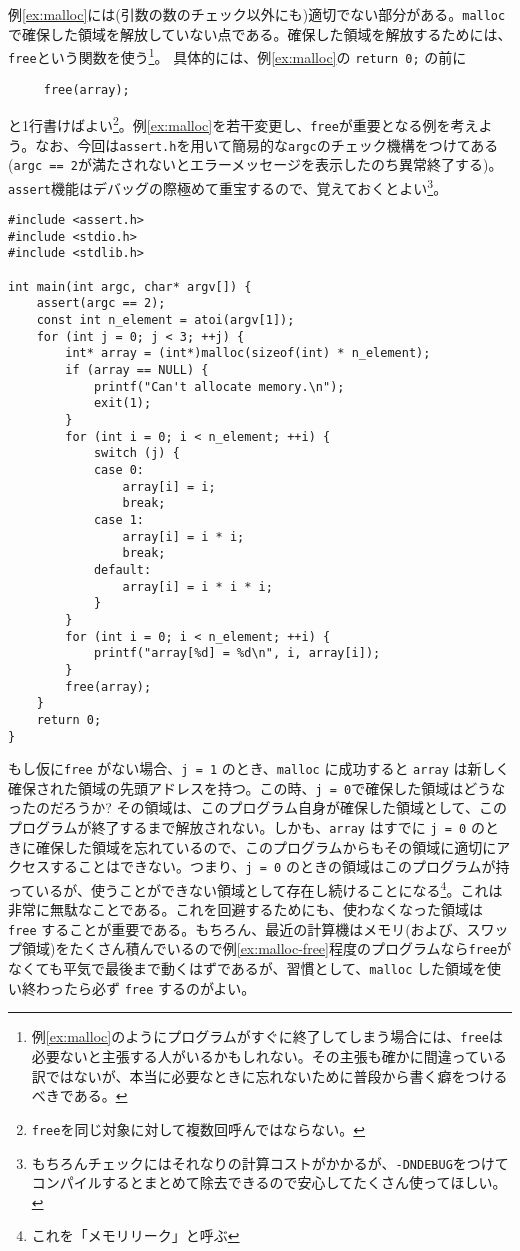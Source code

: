 例\ref{ex:malloc}には(引数の数のチェック以外にも)適切でない部分がある。\texttt{malloc}で確保した領域を解放していない点である。確保した領域を解放するためには、\texttt{free}という関数を使う\footnote{例\ref{ex:malloc}のようにプログラムがすぐに終了してしまう場合には、\texttt{free}は必要ないと主張する人がいるかもしれない。その主張も確かに間違っている訳ではないが、本当に必要なときに忘れないために普段から書く癖をつけるべきである。}。
具体的には、例\ref{ex:malloc}の \texttt{return 0;} の前に
\begin{verbatim}
     free(array);
\end{verbatim}
と1行書けばよい\footnote{\texttt{free}を同じ対象に対して複数回呼んではならない。}。例\ref{ex:malloc}を若干変更し、\texttt{free}が重要となる例を考えよう。なお、今回は\texttt{assert.h}を用いて簡易的な\texttt{argc}のチェック機構をつけてある(\texttt{argc == 2}が満たされないとエラーメッセージを表示したのち異常終了する)。
\texttt{assert}機能はデバッグの際極めて重宝するので、覚えておくとよい\footnote{もちろんチェックにはそれなりの計算コストがかかるが、\texttt{-DNDEBUG}をつけてコンパイルするとまとめて除去できるので安心してたくさん使ってほしい。}。
\begin{reidai}\label{ex:malloc-free}
    \begin{verbatim}
#include <assert.h>
#include <stdio.h>
#include <stdlib.h>

int main(int argc, char* argv[]) {
    assert(argc == 2);
    const int n_element = atoi(argv[1]);
    for (int j = 0; j < 3; ++j) {
        int* array = (int*)malloc(sizeof(int) * n_element);
        if (array == NULL) {
            printf("Can't allocate memory.\n");
            exit(1);
        }
        for (int i = 0; i < n_element; ++i) {
            switch (j) {
            case 0:
                array[i] = i;
                break;
            case 1:
                array[i] = i * i;
                break;
            default:
                array[i] = i * i * i;
            }
        }
        for (int i = 0; i < n_element; ++i) {
            printf("array[%d] = %d\n", i, array[i]);
        }
        free(array);
    }
    return 0;
}
\end{verbatim}
\end{reidai} \noindent
もし仮に\texttt{free} がない場合、\texttt{j = 1} のとき、\texttt{malloc} に成功すると \texttt{array} は新しく確保された領域の先頭アドレスを持つ。この時、\texttt{j = 0}で確保した領域はどうなったのだろうか? その領域は、このプログラム自身が確保した領域として、このプログラムが終了するまで解放されない。しかも、\texttt{array} はすでに \texttt{j = 0} のときに確保した領域を忘れているので、このプログラムからもその領域に適切にアクセスすることはできない。つまり、\texttt{j = 0} のときの領域はこのプログラムが持っているが、使うことができない領域として存在し続けることになる\footnote{これを「メモリリーク」と呼ぶ}。これは非常に無駄なことである。これを回避するためにも、使わなくなった領域は \texttt{free} することが重要である。もちろん、最近の計算機はメモリ(および、スワップ領域)をたくさん積んでいるので例\ref{ex:malloc-free}程度のプログラムなら\texttt{free}がなくても平気で最後まで動くはずであるが、習慣として、\texttt{malloc} した領域を使い終わったら必ず \texttt{free} するのがよい。

